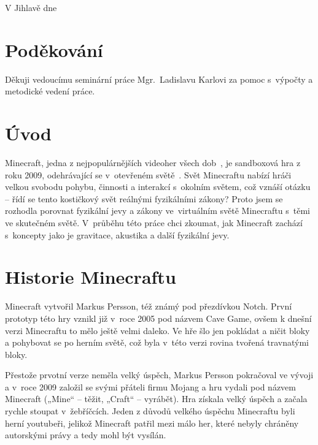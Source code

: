 \documentclass[a4paper, twoside]{article}
\begin{document}
V Jihlavě dne \underline{\hspace{4cm}}

\newpage
\thispagestyle{empty}
\mbox{}
\newpage

\newpage
\thispagestyle{empty}
\vspace*{\fill} 
\section*{Poděkování}
Děkuji vedoucímu seminární práce Mgr.~Ladislavu Karlovi za pomoc s~výpočty a metodické vedení práce.

\newpage
\thispagestyle{empty}
\mbox{}
\newpage

\newpage
\thispagestyle{empty}
\tableofcontents

\newpage
\thispagestyle{empty}
\mbox{}
\newpage

\newpage
\section{Úvod}
Minecraft, jedna z nejpopulárnějších videoher všech dob~\cite{indian-tv-statistics}, je sandboxová hra z roku 2009, odehrávající se v~otevřeném světě~\cite{minecraft-wikipedia}. Svět Minecraftu nabízí hráči velkou svobodu pohybu, činnosti a interakcí s~okolním světem, což vznáší otázku – řídí se tento kostičkový svět reálnými fyzikálními zákony? Proto jsem se rozhodla porovnat fyzikální jevy a zákony ve~virtuálním světě Minecraftu s~těmi ve skutečném světě. V~průběhu této práce chci zkoumat, jak Minecraft zachází s~koncepty jako je gravitace, akustika a další fyzikální jevy.

\section{Historie Minecraftu}
Minecraft vytvořil Markus Persson, též známý pod přezdívkou  Notch. První prototyp této hry vznikl již v~roce 2005 pod názvem Cave Game, ovšem k dnešní verzi Minecraftu to mělo ještě velmi daleko. Ve hře šlo jen pokládat a ničit bloky a pohybovat se po herním světě, což byla v~této verzi rovina tvořená travnatými bloky. 

Přestože prvotní verze neměla velký úspěch, Markus Persson pokračoval ve vývoji a v~roce 2009 založil se svými přáteli firmu  Mojang a hru vydali pod názvem Minecraft („Mine“ – těžit,  „Craft“ – vyrábět). Hra získala velký úspěch a začala rychle stoupat v~žebříčcích. Jeden z důvodů velkého úspěchu Minecraftu byli herní youtubeři, jelikož Minecraft patřil mezi málo her, které nebyly chráněny autorskými právy a tedy mohl být vysílán. 
\end{document}

